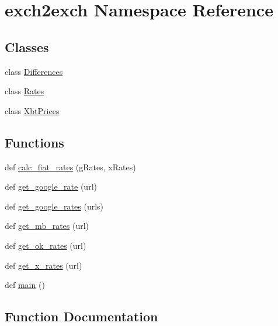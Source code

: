 \hypertarget{namespaceexch2exch}{}\section{exch2exch Namespace Reference}
\label{namespaceexch2exch}
\subsection*{Classes}
\begin{DoxyCompactItemize}
\item 
class \hyperlink{classexch2exch_1_1_differences}{Differences}
\item 
class \hyperlink{classexch2exch_1_1_rates}{Rates}
\item 
class \hyperlink{classexch2exch_1_1_xbt_prices}{Xbt\+Prices}
\end{DoxyCompactItemize}
\subsection*{Functions}
\begin{DoxyCompactItemize}
\item 
def \hyperlink{namespaceexch2exch_a2f3337121882596d0644f2d48ffb870c}{calc\+\_\+fiat\+\_\+rates} (g\+Rates, x\+Rates)
\item 
def \hyperlink{namespaceexch2exch_a20ad08d045d52bdcb3977eaa8f951622}{get\+\_\+google\+\_\+rate} (url)
\item 
def \hyperlink{namespaceexch2exch_ae0891a93a4a9cfe932011afddd41808d}{get\+\_\+google\+\_\+rates} (urls)
\item 
def \hyperlink{namespaceexch2exch_a4226f3cef9fff15993d8b230a5cb92e4}{get\+\_\+mb\+\_\+rates} (url)
\item 
def \hyperlink{namespaceexch2exch_a157dc1519ab4a24783fab8bf7db9c17e}{get\+\_\+ok\+\_\+rates} (url)
\item 
def \hyperlink{namespaceexch2exch_a928a1249a810cfd0ec5fca3ec8f764fb}{get\+\_\+x\+\_\+rates} (url)
\item 
def \hyperlink{namespaceexch2exch_a4a7d6bc2c47add0970ca3e0c28a5cb63}{main} ()
\end{DoxyCompactItemize}


\subsection{Function Documentation}
